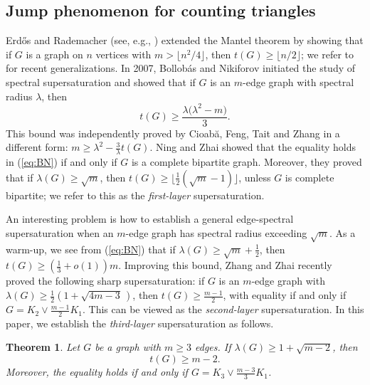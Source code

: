 \documentclass[10pt,a4paper]{amsart}
\newtheorem{theorem}{Theorem}[section]
\renewcommand{\geq}{\geqslant}
\renewcommand{\ge}{\geqslant}
\begin{document}
\subsection{Jump phenomenon for counting triangles}


Erd\H{o}s and Rademacher (see, e.g.,  \cite{Erd1955,Erdos1964}) extended the Mantel theorem by showing that  
if $G$ is a graph on $n$ vertices with 
$m> \lfloor n^2/4 \rfloor$, 
then $t(G) \ge \lfloor {n}/{2}\rfloor$; we refer to \cite{LPS2020,XK2021,LM2022-Erd-Rad,BC2023} for recent generalizations.  
In 2007, Bollob\'as and Nikiforov
\cite{BollobasNikiforov2007} initiated the study of spectral supersaturation and showed that 
if $G$ is an $m$-edge graph with spectral radius $\lambda$, then 
\begin{equation} 
\label{eq:BN}
  t(G) \ge \frac{\lambda \bigl(\lambda^2 - m\bigr)}{3}. 
  \end{equation}
  This bound was independently proved by 
  Cioab\u{a}, Feng, Tait and Zhang \cite[Lemma 7]{CFTZ20} in a different form: $m \ge \lambda^2- \frac{3}{\lambda}t(G)$. 
Ning and Zhai \cite{NingZhai2023} showed that the equality holds in (\ref{eq:BN}) if and only if $G$ is a complete bipartite graph.  
Moreover, they proved that if $\lambda(G)\geq \sqrt m$, then $t(G)\ge \lfloor \frac{1}{2} (\sqrt{m}-1) \rfloor$, unless  $G$ is complete bipartite;  
we refer to this as the {\it first-layer} supersaturation. 


\smallskip 
An interesting problem is how to establish a general edge-spectral supersaturation when an $m$-edge graph has spectral radius exceeding $\sqrt{m}$. 
As a warm-up, we see from (\ref{eq:BN}) 
that if $\lambda (G)\ge \sqrt{m} + \frac{1}{2}$, then $t(G)\ge \left( \frac{1}{3} + o(1) \right)m$.  
Improving this bound, 
Zhang and Zhai \cite{ZZ2026} recently proved the following sharp supersaturation: if $G$ is an $m$-edge graph with $\lambda (G)\ge \frac{1}{2} (1+ \sqrt{4m-3}\,)$, then 
$ t(G) \ge \frac{m-1}{2}$,  
with equality if and only if 
$G=K_2\vee \frac{m-1}{2}K_1$. This can be viewed as the {\it second-layer} supersaturation.  
In this paper, we establish the {\it third-layer}   supersaturation as follows. 


\begin{theorem} \label{thm:m-2}
Let $G$ be a graph with $m\ge 3$ edges.  If
$\lambda(G)\ge 1+\sqrt{m-2}$, 
then 
\[
        t(G)\ge m-2.
\]
Moreover, the equality holds if and only if
       $G=K_3\vee \frac{m-3}{3}K_1$. 
\end{theorem}
\end{document}
